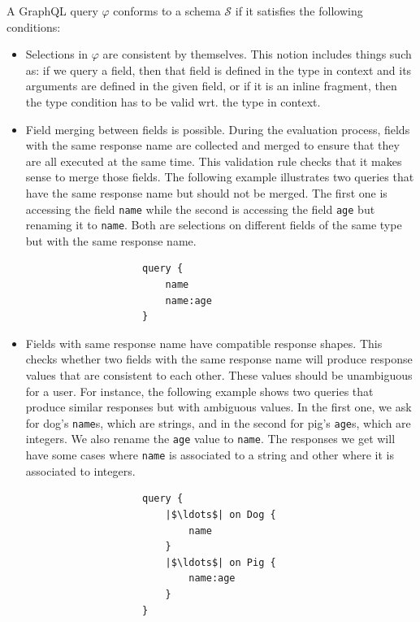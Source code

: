 \begin{definition}
A GraphQL query $\varphi$ conforms to a schema $\mathcal{S}$ if it satisfies the following conditions:
\begin{itemize}
    \item Selections in $\varphi$ are consistent by themselves. This notion includes things such as: if we query a field, then that field is defined in the  type in context and its arguments are defined in the given field, or if it is an inline fragment, then the type condition has to be valid wrt. the type in context. 
    
    \item Field merging between fields is possible. During the evaluation process, fields with the same response name are collected and merged to ensure that they are all executed at the same time. This validation rule checks that it makes sense to merge those fields. The following example illustrates two queries that have the same response name but should not be merged. The first one is accessing the field \texttt{name} while the second is accessing the field \texttt{age} but renaming it to \texttt{name}. Both are selections on different fields of the same type but with the same response name.
    \begin{verbatim}
                    query {
                        name
                        name:age
                    }
    \end{verbatim}
    
    \item Fields with same response name have compatible response shapes. This checks whether two fields with the same response name will produce response values that are consistent to each other. These values should be unambiguous for a user. For instance, the following example shows two queries that produce similar responses but with ambiguous values. In the first one, we ask for dog's \texttt{name}s, which are strings, and in the second for pig's \texttt{age}s, which are integers. We also rename the \texttt{age} value to \texttt{name}. The responses we get will have some cases where \texttt{name} is associated to a string and other where it is associated to integers.
    \begin{verbatim}
                    query {
                        |$\ldots$| on Dog {
                            name
                        }
                        |$\ldots$| on Pig {
                            name:age
                        }
                    }
    \end{verbatim}
\end{itemize}
\end{definition}

